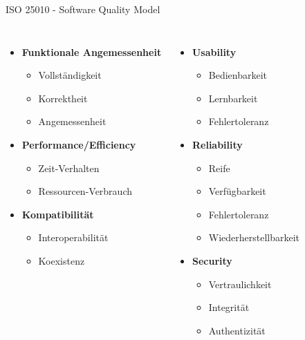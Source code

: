 \begin{frame}{ISO 25010 - Software Quality Model}
  \begin{columns}[T]
    \begin{itemize}
      \item \textbf{Funktionale Angemessenheit}
        \begin{itemize}
          \item Vollständigkeit
          \item Korrektheit
          \item Angemessenheit
        \end{itemize}
      \item \textbf{Performance/Efficiency}
        \begin{itemize}
          \item Zeit-Verhalten
          \item Ressourcen-Verbrauch
        \end{itemize}
      \item \textbf{Kompatibilität}
        \begin{itemize}
          \item Interoperabilität
          \item Koexistenz
        \end{itemize}
    \end{itemize}

    \begin{itemize}
      \item \textbf{Usability}
        \begin{itemize}
          \item Bedienbarkeit
          \item Lernbarkeit
          \item Fehlertoleranz
        \end{itemize}
      \item \textbf{Reliability}
        \begin{itemize}
          \item Reife
          \item Verfügbarkeit
          \item Fehlertoleranz
          \item Wiederherstellbarkeit
        \end{itemize}
      \item \textbf{Security}
        \begin{itemize}
          \item Vertraulichkeit
          \item Integrität
          \item Authentizität
        \end{itemize}
    \end{itemize}


\end{columns}
\end{frame}
